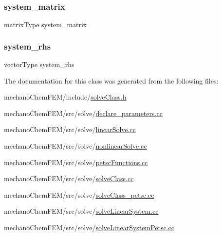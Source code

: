 \subsubsection{\texorpdfstring{system\_matrix}{system\_matrix}}
{\footnotesize\ttfamily matrix\+Type system\+\_\+matrix}

\mbox{\label{classsolve_class_a6c39fa839fdc40d2408946617a778571}} 
\subsubsection{\texorpdfstring{system\_rhs}{system\_rhs}}
{\footnotesize\ttfamily vector\+Type system\+\_\+rhs}



The documentation for this class was generated from the following files\+:\begin{DoxyCompactItemize}
\item 
mechano\+Chem\+F\+E\+M/include/\mbox{\hyperlink{solve_class_8h}{solve\+Class.\+h}}\item 
mechano\+Chem\+F\+E\+M/src/solve/\mbox{\hyperlink{solve_2declare__parameters_8cc}{declare\+\_\+parameters.\+cc}}\item 
mechano\+Chem\+F\+E\+M/src/solve/\mbox{\hyperlink{linear_solve_8cc}{linear\+Solve.\+cc}}\item 
mechano\+Chem\+F\+E\+M/src/solve/\mbox{\hyperlink{nonlinear_solve_8cc}{nonlinear\+Solve.\+cc}}\item 
mechano\+Chem\+F\+E\+M/src/solve/\mbox{\hyperlink{petsc_functions_8cc}{petsc\+Functions.\+cc}}\item 
mechano\+Chem\+F\+E\+M/src/solve/\mbox{\hyperlink{solve_class_8cc}{solve\+Class.\+cc}}\item 
mechano\+Chem\+F\+E\+M/src/solve/\mbox{\hyperlink{solve_class__petsc_8cc}{solve\+Class\+\_\+petsc.\+cc}}\item 
mechano\+Chem\+F\+E\+M/src/solve/\mbox{\hyperlink{solve_linear_system_8cc}{solve\+Linear\+System.\+cc}}\item 
mechano\+Chem\+F\+E\+M/src/solve/\mbox{\hyperlink{solve_linear_system_petsc_8cc}{solve\+Linear\+System\+Petsc.\+cc}}\end{DoxyCompactItemize}

